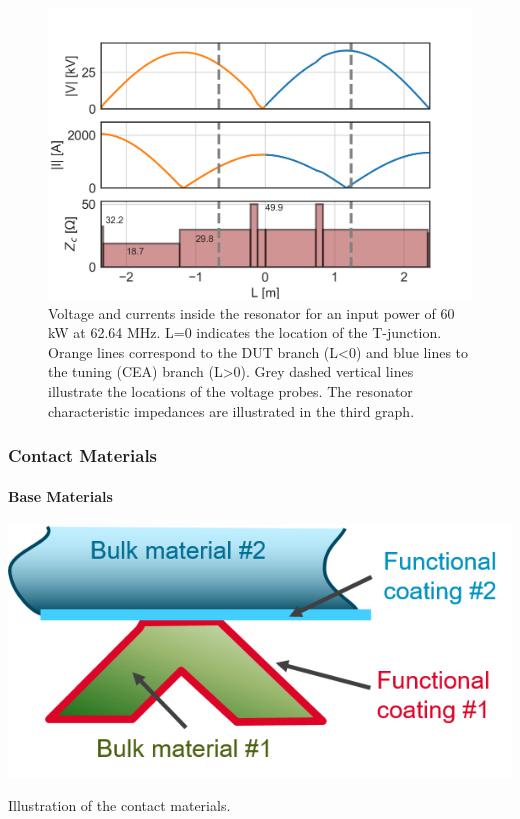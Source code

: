 {\begin{figure}[h]
	\centering
	\includegraphics[width=1.0\linewidth]{figures/chap3/RF_contacts/RF_contact_Tresonator_current_voltage}
	\caption{Voltage and currents inside the resonator for an input power of 60 kW at 62.64 MHz. L=0 indicates the location of the T-junction. Orange lines correspond to the DUT branch (L<0) and blue lines to the tuning (CEA) branch (L>0). Grey dashed vertical lines illustrate the locations of the voltage probes. The resonator characteristic impedances are illustrated in the third graph.}
	\label{fig:rfcontacttresonatorcurrentvoltage}
\end{figure}




\subsubsection{Contact Materials}
\paragraph{Base Materials}

\begin{marginfigure}
	\centering
	\includegraphics[width=1.0\linewidth]{figures/chap3/RF_contacts/RF_contact_materials}
	\caption{Illustration of the contact materials.}
	\label{fig:rfcontactmaterials}
\end{marginfigure}

}
